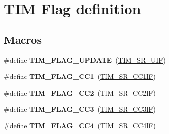 \hypertarget{group___t_i_m___flag__definition}{}\section{T\+IM Flag definition}
\label{group___t_i_m___flag__definition}
\subsection*{Macros}
\begin{DoxyCompactItemize}
\item 
\#define {\bfseries T\+I\+M\+\_\+\+F\+L\+A\+G\+\_\+\+U\+P\+D\+A\+TE}~(\hyperlink{group___peripheral___registers___bits___definition_gac8c03fabc10654d2a3f76ea40fcdbde6}{T\+I\+M\+\_\+\+S\+R\+\_\+\+U\+IF})\hypertarget{group___t_i_m___flag__definition_gac45ce66cf33b4f324323fc3036917712}{}\label{group___t_i_m___flag__definition_gac45ce66cf33b4f324323fc3036917712}

\item 
\#define {\bfseries T\+I\+M\+\_\+\+F\+L\+A\+G\+\_\+\+C\+C1}~(\hyperlink{group___peripheral___registers___bits___definition_ga449a61344a97608d85384c29f003c0e9}{T\+I\+M\+\_\+\+S\+R\+\_\+\+C\+C1\+IF})\hypertarget{group___t_i_m___flag__definition_gaa7eb8be054b9bd217a9abb1c8687cc55}{}\label{group___t_i_m___flag__definition_gaa7eb8be054b9bd217a9abb1c8687cc55}

\item 
\#define {\bfseries T\+I\+M\+\_\+\+F\+L\+A\+G\+\_\+\+C\+C2}~(\hyperlink{group___peripheral___registers___bits___definition_ga25a48bf099467169aa50464fbf462bd8}{T\+I\+M\+\_\+\+S\+R\+\_\+\+C\+C2\+IF})\hypertarget{group___t_i_m___flag__definition_ga9cae242f1c51b31839ffc5bc007c82a7}{}\label{group___t_i_m___flag__definition_ga9cae242f1c51b31839ffc5bc007c82a7}

\item 
\#define {\bfseries T\+I\+M\+\_\+\+F\+L\+A\+G\+\_\+\+C\+C3}~(\hyperlink{group___peripheral___registers___bits___definition_gad3cf234a1059c0a04799e88382cdc0f2}{T\+I\+M\+\_\+\+S\+R\+\_\+\+C\+C3\+IF})\hypertarget{group___t_i_m___flag__definition_ga052c380f922219659810e4fceb574a7c}{}\label{group___t_i_m___flag__definition_ga052c380f922219659810e4fceb574a7c}

\item 
\#define {\bfseries T\+I\+M\+\_\+\+F\+L\+A\+G\+\_\+\+C\+C4}~(\hyperlink{group___peripheral___registers___bits___definition_gacade8a06303bf216bfb03140c7e16cac}{T\+I\+M\+\_\+\+S\+R\+\_\+\+C\+C4\+IF})\hypertarget{group___t_i_m___flag__definition_gafd0dc57b56941f8b8250d66e289542db}{}\label{group___t_i_m___flag__definition_gafd0dc57b56941f8b8250d66e289542db}


\end{DoxyCompactItemize}
